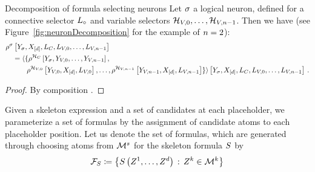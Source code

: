 \begin{theorem}{Decomposition of formula selecting neurons}\label{the:neuronDecomposition}
	Let $\sigma$ a logical neuron, defined for a connective selector $L_{\circ}$ and variable selectors $\mathcal{H}_{V,0},\ldots,\mathcal{H}_{V,n-1}$.
	Then we have (see Figure~\ref{fig:neuronDecomposition} for the example of $n=2$):
	\begin{align*}
		&\rho^{\sigma}\left[Y_{\sigma},X_{[d]},L_{C},L_{V,0},\ldots,L_{V,n-1}\right] \\
		&\quad = \langle\{\rho^{\mathcal{H}_{C}}\left[
				Y_{\sigma},Y_{V,0},\ldots,Y_{V,n-1}\right], \\
		& \quad\quad\quad\rho^{\mathcal{H}_{V,0}}\left[
				Y_{V,0},X_{[d]},L_{V,0}\right],\ldots,
				\rho^{\mathcal{H}_{V,n-1}}\left[
					Y_{V,n-1},X_{[d]},L_{V,n-1}\right]
				\} \rangle
		\left[Y_{\sigma},X_{[d]}, L_{C},L_{V,0},\ldots,L_{V,n-1}\right] \, .
	\end{align*}
\end{theorem}
\begin{proof}
	By composition .
\end{proof}




Given a skeleton expression and a set of candidates at each placeholder, we parameterize a set of formulas by the assignment of candidate atoms to each placeholder position.
Let us denote the set of formulas, which are generated through choosing atoms from $\mathcal{M}^{s}$ for the skeleton formula $S$ by
		\[ \mathcal{F}_{S} \coloneqq 
	 \left\{ S\left(Z^{1},\ldots,Z^{d}\right) \, : \, Z^{k} \in \mathcal{M}^{k} \right\} \]


